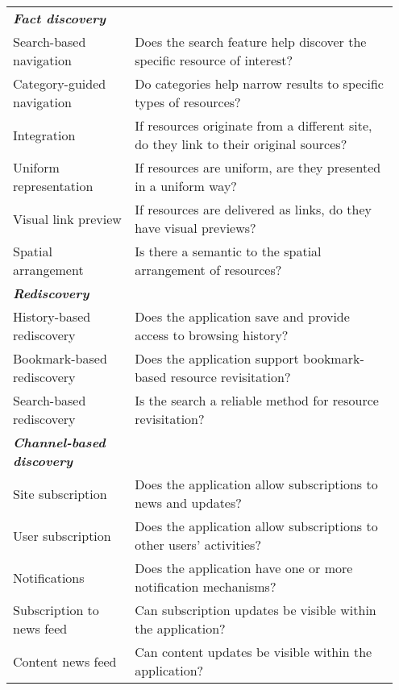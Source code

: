 \begin{table*}[htbp]
\begin{tabular}{|p{0.30\linewidth}|p{0.65\linewidth}|}
\emph{\textbf{Fact discovery}}                &                                                                                                           \\
Search-based navigation      & Does the search feature help discover the specific resource of interest?                                  \\
Category-guided navigation & Do categories help narrow results to specific types of resources?                                   \\
Integration                  & If resources originate from a different site, do they link to their original sources?                   \\
Uniform representation       & If resources are uniform, are they presented in a uniform way? \\
Visual link preview               & If resources are delivered as links, do they have visual previews?                                                                        \\
Spatial arrangement          & Is there a semantic to the spatial arrangement of resources?                                                    \\

\emph{\textbf{Rediscovery}}                     &                                                                                                           \\
History-based rediscovery    & Does the application save and provide access to browsing history?                                        \\
Bookmark-based rediscovery   & Does the application support bookmark-based resource revisitation?                                        \\
Search-based rediscovery     & Is the search a reliable method for resource revisitation?                             \\

\emph{\textbf{Channel-based discovery}}          &                                                                                                           \\
Site subscription            & Does the application allow subscriptions to news and updates?                                             \\
User subscription             & Does the application allow subscriptions to other users' activities?                                      \\
Notifications                & Does the application have one or more notification mechanisms?                                                      \\
Subscription to news feed                  & Can subscription updates be visible within the application?  \\
Content news feed                  & Can content updates be visible within the application? \\


\end{tabular}
\end{table*}
